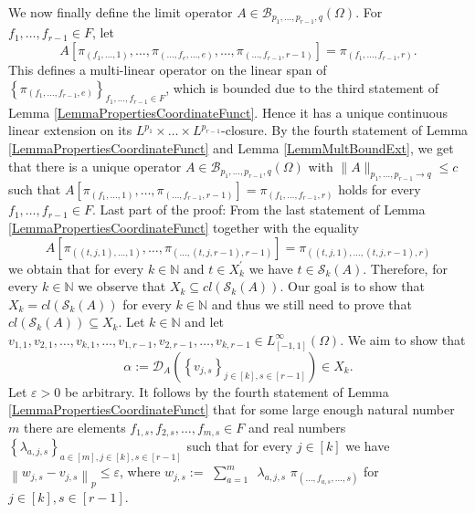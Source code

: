 \documentclass[11pt]{article}
\begin{document}

\endproof

We now finally define the limit operator $A \in \mathcal{B}_{p_1,\ldots,p_{r-1}, q}(\Omega)$. For $f_1,\ldots,f_{r-1} \in F$, let 
$$ A[\pi_{(f_1,\ldots, 1)},\ldots,\pi_{(\ldots,f_e,\ldots, e)},\ldots, \pi_{(\ldots,f_{r-1}, r-1)}]=\pi_{(f_1,\ldots,f_{r-1},r)}.$$This defines a multi-linear operator on the linear span of $\left\{\pi_{(f_1,\ldots,f_{r-1}, e)}\right\}_{f_1,\ldots,f_{r-1} \in F}$, which is bounded due to the third statement of Lemma \ref{LemmaPropertiesCoordinateFunct}. 
Hence it has a unique continuous linear extension on its $L^{p_1}\times \ldots \times L^{p_{r-1}}$-closure. 
By the fourth statement of Lemma \ref{LemmaPropertiesCoordinateFunct} and Lemma \ref{LemmMultBoundExt}, we get that there is a unique operator $A \in \mathcal{B}_{p_1,\ldots,p_{r-1}, q}(\Omega)$ with $\|A\|_{p_1,\ldots,p_{r-1} \rightarrow q} \leq c$ such that $ A[\pi_{(f_1,\ldots, 1)},\ldots,\pi_{(\ldots,f_{r-1} ,r-1)}]=\pi_{(f_1,\ldots,f_{r-1}, r)}$ holds for every $f_1,\ldots,f_{r-1} \in F$.\newline
Last part of the proof: From the last statement of Lemma \ref{LemmaPropertiesCoordinateFunct} together with the equality $$A[\pi_{((t, j,1),\ldots, 1)},\ldots, \pi_{(\ldots, (t, j,r-1), r-1)}] =\pi_{((t, j, 1),\ldots,(t, j, r-1), r)}$$we obtain that for every $k \in \mathbb{N}$ and $t \in X_{k}^{\prime}$ we have $t \in \mathcal{S}_{k}(A)$. Therefore, for every $k \in \mathbb{N}$ we observe that $X_{k} \subseteq cl(\mathcal{S}_{k}(A))$. Our goal is to show that $X_{k}=cl(\mathcal{S}_{k}(A))$ for every $k \in \mathbb{N}$ and thus we still need to prove that $cl(\mathcal{S}_{k}(A) )\subseteq X_{k}$. Let $k \in \mathbb{N}$ and let $v_{1,1}, v_{2,1}, \ldots, v_{k,1}, \ldots ,v_{1,r-1}, v_{2,r-1}, \ldots, v_{k,r-1} \in L_{[-1,1]}^{\infty}(\Omega)$. We aim to show that $$\alpha:=\mathcal{D}_{A}\left(\left\{v_{j,s}\right\}_{j\in[k],s\in [r-1]}\right)\in X_{k}.$$ Let $\varepsilon>0$ be arbitrary. It follows by the fourth statement of Lemma \ref{LemmaPropertiesCoordinateFunct} that for some large enough natural number $m$ there are elements $f_{1,s}, f_{2,s}, \ldots, f_{m,s} \in F$ and real numbers $\left\{\lambda_{a, j,s}\right\}_{a \in[m], j \in[k] , s\in [r-1]}$ such that for every $j \in[k]$ we have $\left\|w_{j,s}-v_{j,s}\right\|_{p} \leq \varepsilon$, where $w_{j,s}:=$ $\sum_{a=1}^{m}$\ $ \lambda_{a, j,s}$  $ \pi_{\left(\ldots, f_{a,s},\ldots, s\right) }$ for $j \in[k], s\in [r-1]$.
\end{document}
